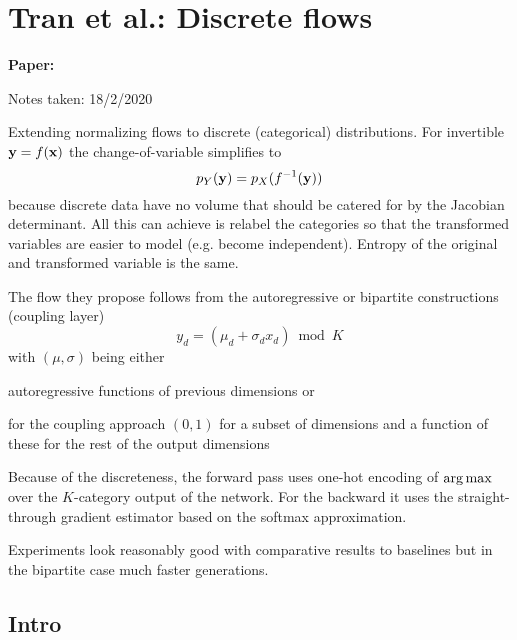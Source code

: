 \clearpage

\section{Tran et al.: Discrete flows}

\begin{notebox}
\textbf{Paper: } 

\hfill Notes taken: 18/2/2020 
\end{notebox}

\begin{notebox}
\tldr Extending normalizing flows to discrete (categorical) distributions. For invertible $\mathbf{y} = f(\mathbf{x})$ the change-of-variable simplifies to 
\begin{equation}
p_Y(\mathbf{y}) = p_X(f^{-1}(\mathbf{y}))
\end{equation}
because discrete data have no volume that should be catered for by the Jacobian determinant.
All this can achieve is relabel the categories so that the transformed variables are easier to model (e.g. become independent). Entropy of the original and transformed variable is the same.

The flow they propose follows from the autoregressive or bipartite constructions (coupling layer)
\begin{equation}
y_d = (\mu_d + \sigma_d x_d)\bmod K
\end{equation}
with $(\mu, \sigma)$ being either
\begin{compactitem}
\item autoregressive functions of previous dimensions or
\item for the coupling approach $(0, 1)$ for a subset of dimensions and a function of these for the rest of the output dimensions
\end{compactitem}
Because of the discreteness, the forward pass uses one-hot encoding of $\operatorname*{arg\,max}$ over the $K$-category output of the network. For the backward it uses the straight-through gradient estimator based on the softmax approximation.

Experiments look reasonably good with comparative results to baselines but in the bipartite case much faster generations.

\end{notebox}

\subsection{Intro}

